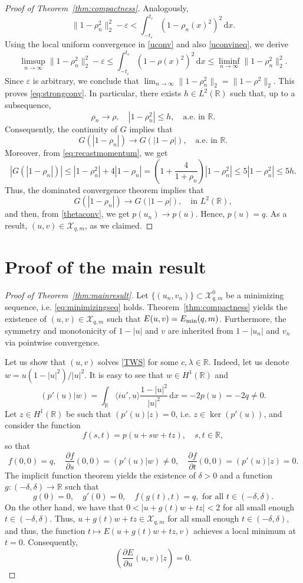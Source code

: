 \documentclass[11pt]{article}
\newcommand{\R}{\mathbb{R}}
\newcommand{\boX}{\mathcal{X}}
\newcommand{\Emin}{E_\textup{min}}
\renewcommand{\d}{\,\mathrm{d}}
\theoremstyle{plain}
\theoremstyle{definition}
\theoremstyle{remark}
\numberwithin{equation}{section}
\begin{document}
{\begin{proof}[Proof of Theorem~\ref{thm:compactness}]
   Analogously, 
   \[\|1-\rho_n^2\|_2^2-\varepsilon<\int_{-t_\varepsilon}^{t_\varepsilon}(1-\rho_n(x)^2)^2\d x.\]
   Using the local uniform convergence in \eqref{uconv} and also \eqref{uconvineq}, we derive
   \[\limsup_{n\to\infty}\|1-\rho_n^2\|_2^2-\varepsilon\leq\int_{-t_\varepsilon}^{t_\varepsilon}(1-\rho(x)^2)^2\d x\leq \liminf_{n\to\infty}\|1-\rho_n^2\|_2^2.\]
   Since $\varepsilon$ is arbitrary, we conclude that $\lim_{n\to\infty}\|1-\rho_n^2\|_2=\|1-\rho^2\|_2$. This proves \eqref{eq:strongconv}. In particular, there exists $h\in L^2(\R)$ such that, up to a subsequence,
   \[\rho_n\to \rho,\quad |1-\rho_n^2|\leq h,\quad\text{a.e. in }\R.\]
   Consequently, the continuity of $G$ implies that 
   \[G(|1-\rho_n|)\to G(|1-\rho|),\quad\text{a.e. in }\R.\]
   Moreover, from \eqref{eq:recastmomentum}, we get
   \[|G(|1-\rho_n|)|\leq |1-\rho_n^2|+4|1-\rho_n|=\left(1+\frac{4}{1+\rho_n}\right)|1-\rho_n^2|\leq 5|1-\rho_n^2|\leq 5h.\]
   Thus, the dominated convergence theorem implies that 
   \[G(|1-\rho_n|)\to G(|1-\rho|),\quad\text{in }L^2(\R),\]
   and then, from \eqref{thetaconv}, we get $p(u_n)\to p(u)$. Hence, $p(u)=q$. As a result, $(u,v)\in \boX_{q,m}$, as we claimed.
\end{proof}

   

   





\section{Proof of the main result}\label{sec:proof}

\begin{proof}[Proof of Theorem~\ref{thm:mainresult}] Let $\{(u_n,v_n)\}\subset\boX_{q,m}^0$ be a minimizing sequence, i.e. \eqref{eq:minimizingseq} holds. Theorem~\ref{thm:compactness} yields the existence of $(u,v)\in\boX_{q,m}$ such that  $E(u,v)=\Emin(q,m)$. Furthermore, the symmetry and monotonicity of $1-|u|$ and $v$ are inherited from $1-|u_n|$ and $v_n$ via pointwise convergence. 

Let us show that $(u,v)$ solves \eqref{TWS} for some $c,\lambda\in\R$. Indeed, let us denote $w=u(1-|u|^2)/|u|^2$. It is easy to see that $w\in H^1(\R)$ and
    \[(p'(u)|w)=\int_\R\langle iu',u\rangle\frac{1-|u|^2}{|u|^2}\d x=-2p(u)=-2q\not=0.\]
    Let $z\in H^1(\R)$ be such that $(p'(u)|z)=0$, i.e. $z\in\ker(p'(u))$, and consider the function
    \[f(s,t)=p(u+sw+tz),\quad s,t\in\R,\]
    so that 
    \[f(0,0)=q,\quad \frac{\partial f}{\partial s}(0,0)=(p'(u)|w)\not=0,\quad\frac{\partial f}{\partial t}(0,0)=(p'(u)|z)=0.\]
    The implicit function theorem yields the existence of $\delta>0$ and a function $g:(-\delta,\delta)\to\R$ such that 
    \[g(0)=0,\quad g'(0)=0,\quad f(g(t),t)=q,\text{  for all }t\in(-\delta,\delta).\]
    On the other hand, we have that $0<|u+g(t)w+tz|<2$ for all small enough $t\in (-\delta,\delta)$. Thus, $u+g(t)w+tz\in\boX_{q,m}$ for all small enough $t\in (-\delta,\delta)$, and thus, the function $t\mapsto E(u+g(t)w+tz,v)$ achieves a local minimum at $t=0$. Consequently, 
    \[\left(\frac{\partial E}{\partial u}(u,v)|z\right)=0.\] 
    

\end{proof}}
\end{document}
